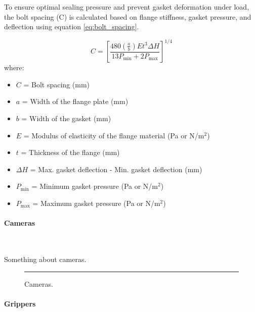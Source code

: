 To ensure optimal sealing pressure and prevent gasket deformation under load, the bolt spacing (C) is calculated based on flange stiffness, gasket pressure, and deflection using equation \ref{eq:bolt_spacing}.

\begin{equation} \label{eq:bolt_spacing}
    C = \left[ \frac{480 \left( \frac{a}{b} \right) E t^3 \Delta H}{13 P_{\text{min}} + 2 P_{\text{max}}} \right]^{1/4}
    \end{equation}
    where:
    \vspace{-0.5\baselineskip}
    \begin{itemize}
        \setlength{\itemsep}{0pt}
        \item \(C\) = Bolt spacing (mm)
        \item \(a\) = Width of the flange plate (mm)
        \item \(b\) = Width of the gasket (mm)
        \item \(E\) = Modulus of elasticity of the flange material (Pa or N/m\(^2\))
        \item \(t\) = Thickness of the flange (mm)
        \item \(\Delta H\) = Max. gasket deflection - Min. gasket deflection (mm)
        \item \(P_{\text{min}}\) = Minimum gasket pressure (Pa or N/m\(^2\))
        \item \(P_{\text{max}}\) = Maximum gasket pressure (Pa or N/m\(^2\))
    \end{itemize}
    

\vspace{-0.3cm}
\paragraph{Cameras} \ \\
\vspace{-0.5cm}

Something about cameras. \lipsum[1]

\begin{figure}[h]
    \centering
    \rule{0.8\columnwidth}{4cm}
    \caption{Cameras.}
    \label{fig:cameras}
\end{figure}

\vspace{-0.3cm}
\paragraph{Grippers} \ \\
\vspace{-0.5cm}

